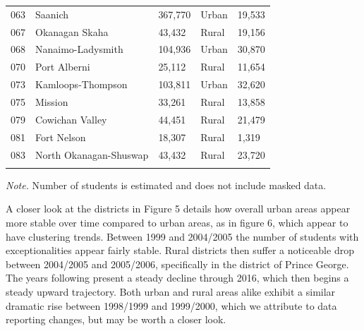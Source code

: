 \documentclass[
  english,
  man,floatsintext]{apa6}
\begin{document}
\begin{table}[tbp]
\begin{center}
\begin{threeparttable}
\begin{tabular}{lllll}
063 & Saanich & 367,770 & Urban & 19,533\\
067 & Okanagan Skaha & 43,432 & Rural & 19,156\\
068 & Nanaimo-Ladysmith & 104,936 & Urban & 30,870\\
070 & Port Alberni & 25,112 & Rural & 11,654\\
073 & Kamloops-Thompson & 103,811 & Urban & 32,620\\
075 & Mission & 33,261 & Rural & 13,858\\
079 & Cowichan Valley & 44,451 & Rural & 21,479\\
081 & Fort Nelson & 18,307 & Rural & 1,319\\
083 & North Okanagan-Shuswap & 43,432 & Rural & 23,720\\
\bottomrule
\addlinespace
\end{tabular}

\begin{tablenotes}[para]
\normalsize{\textit{Note.} Number of students is estimated and does not include masked data.}
\end{tablenotes}

\end{threeparttable}
\end{center}

\end{table}

A closer look at the districts in Figure 5 details how overall urban areas appear more stable over time compared to urban areas, as in figure 6, which appear to have clustering trends. Between 1999 and 2004/2005 the number of students with exceptionalities appear fairly stable. Rural districts then suffer a noticeable drop between 2004/2005 and 2005/2006, specifically in the district of Prince George. The years following present a steady decline through 2016, which then begins a steady upward trajectory. Both urban and rural areas alike exhibit a similar dramatic rise between 1998/1999 and 1999/2000, which we attribute to data reporting changes, but may be worth a closer look.
\end{document}
